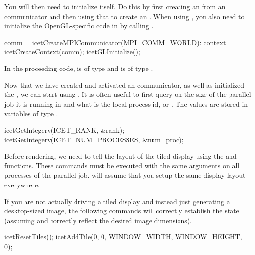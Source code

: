 You will then need to initialize \IceT itself.  Do this by first creating
an \IceT {} from an \MPI
communicator and then using that to create an
.  When using \OpenGL, you also
need to initialize the OpenGL-specific code in \IceT by calling
.

\begin{code}
    comm = icetCreateMPICommunicator(MPI_COMM_WORLD);
    context = icetCreateContext(comm);
    icetGLInitialize();
\end{code}

In the proceeding code,  is of type
 and  is of
type .

Now that we have created and activated an \IceT communicator, as well as
initialized the \IceT {}, we can start using
\IceT.  It is often useful to first query \IceT on the size of the parallel
job it is running in and what is the local process id, or
.  The values are stored in variables of type
.

\begin{code}
    icetGetIntegerv(ICET_RANK, &rank);
    icetGetIntegerv(ICET_NUM_PROCESSES, &num_proc);
\end{code}

Before rendering, we need to tell \IceT the layout of the tiled display
using the  and  functions.  These
commands must be executed with the same arguments on all processes of the
parallel job.  \IceT will assume that you setup the same display layout
everywhere.

If you are not actually driving a tiled display and instead just generating
a desktop-sized image, the following commands will correctly establish the
\IceT state (assuming  and 
correctly reflect the desired image dimensions).

\begin{code}
    icetResetTiles();
    icetAddTile(0, 0, WINDOW_WIDTH, WINDOW_HEIGHT, 0);
\end{code}

